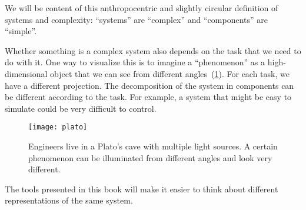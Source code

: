 We will be content of this anthropocentric and slightly circular definition of systems and complexity: ``systems'' are ``complex'' and ``components'' are ``simple''.

Whether something is a complex system also depends on the task that we need to do with it.
One way to visualize this is to imagine a ``phenomenon'' as a high-dimensional object that we can see from different angles~(\cref{fig:aspects}).
For each task, we have a different projection.
The decomposition of the system in components can be different according to the task.
For example, a system that might be easy to simulate could be very difficult to control.

\begin{figure}[h]
    \centering
    \texttt{[image: plato]}
    \caption{
        Engineers live in a Plato's cave with multiple light sources.
        A certain phenomenon can be illuminated from different angles and look very different.
    }
    \label{fig:aspects}
\end{figure}


The tools presented in this book will make it easier to think about different representations of the same system.






